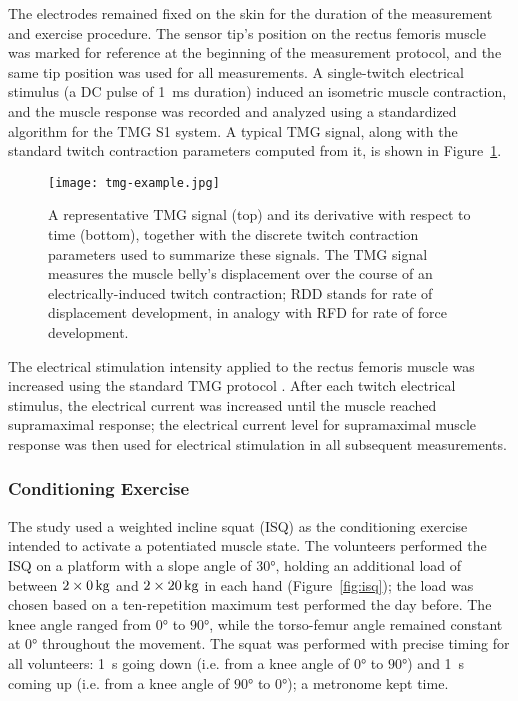 \documentclass[utf8]{FrontiersinHarvard}
\begin{document}
The electrodes remained fixed on the skin for the duration of the measurement and exercise procedure.
The sensor tip's position on the rectus femoris muscle was marked for reference at the beginning of the measurement protocol, and the same tip position was used for all measurements.
A single-twitch electrical stimulus (a DC pulse of \SI{1}{\milli \second} duration) induced an isometric muscle contraction,
and the muscle response was recorded and analyzed using a standardized algorithm for the TMG S1 system.
A typical TMG signal, along with the standard twitch contraction parameters computed from it, is shown in Figure~\ref{fig:tmg_example}.

\begin{figure}
	\centering
    \texttt{[image: tmg-example.jpg]}
    \caption{A representative TMG signal (top) and its derivative with respect to time (bottom), together with the discrete twitch contraction parameters used to summarize these signals.
    The TMG signal measures the muscle belly's displacement over the course of an electrically-induced twitch contraction;
    RDD stands for rate of displacement development, in analogy with RFD for rate of force development.}
    \label{fig:tmg_example}
\end{figure}

The electrical stimulation intensity applied to the rectus femoris muscle was increased using the standard TMG protocol \citep{valencic, dahmane-fiber, dahmane-measurement}.
After each twitch electrical stimulus, the electrical current was increased until the muscle reached supramaximal response;
the electrical current level for supramaximal muscle response was then used for electrical stimulation in all subsequent measurements.

\subsubsection{Conditioning Exercise}
The study used a weighted incline squat (ISQ) as the conditioning exercise intended to activate a potentiated muscle state. 
The volunteers performed the ISQ on a platform with a slope angle of $ \ang{30} $, holding an additional load of between $ \SI[parse-numbers = false, mode = match]{2 \times 0}{\kilogram} $ and $ \SI[parse-numbers = false, mode = match]{2 \times 20}{\kilogram} $ in each hand (Figure~\ref{fig:isq});
the load was chosen based on a ten-repetition maximum test performed the day before.
The knee angle ranged from $ \ang{0} $ to $ \ang{90} $, while the torso-femur angle remained constant at $ \ang{0} $ throughout the movement.
The squat was performed with precise timing for all volunteers: \SI{1}{\second} going down (i.e. from a knee angle of $ \ang{0} $ to $ \ang{90} $) and \SI{1}{\second} coming up (i.e. from a knee angle of $ \ang{90} $ to $ \ang{0} $); a metronome kept time.
\end{document}
